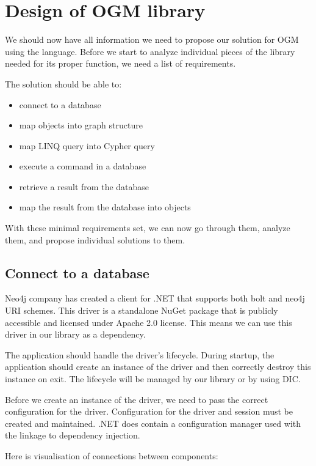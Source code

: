 \chapter {Design of OGM library}

We should now have all information we need to propose our solution for OGM using the \CS language.
Before we start to analyze individual pieces of the library needed for its proper function, we need a list of requirements.

The solution should be able to:
\begin{itemize}
    \item {connect to a database}
    \item {map objects into graph structure}
    \item {map LINQ query into Cypher query}
    \item {execute a command in a database}
    \item {retrieve a result from the database}
    \item {map the result from the database into objects}
\end{itemize}

With these minimal requirements set, we can now go through them, analyze them, and propose individual solutions to them.

\section{Connect to a database}

Neo4j company has created a client for .NET that supports both bolt and neo4j URI schemes. \cite{noauthor_client_nodate} This driver is a standalone NuGet package that is publicly accessible and licensed under Apache 2.0 license. This means we can use this driver in our library as a dependency.

The application should handle the driver's lifecycle. During startup, the application should create an instance of the driver and then correctly destroy this instance on exit. The lifecycle will be managed by our library or by using DIC.

Before we create an instance of the driver, we need to pass the correct configuration for the driver. Configuration for the driver and session must be created and maintained. .NET does contain a configuration manager used with the linkage to dependency injection.

Here is visualisation of connections between components:

